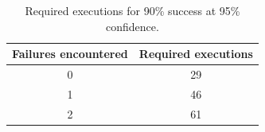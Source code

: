 \begin{table}[htbp]
  \centering
  \caption{Required executions for 90\% success at 95\% confidence.}
  \label{tab:required-runs}
  \begin{tabular}{@{}cc@{}}
    \toprule
    Failures encountered & Required executions \\
    \midrule
    0 & 29 \\
    1 & 46 \\
    2 & 61 \\
    \bottomrule
  \end{tabular}
\end{table}
